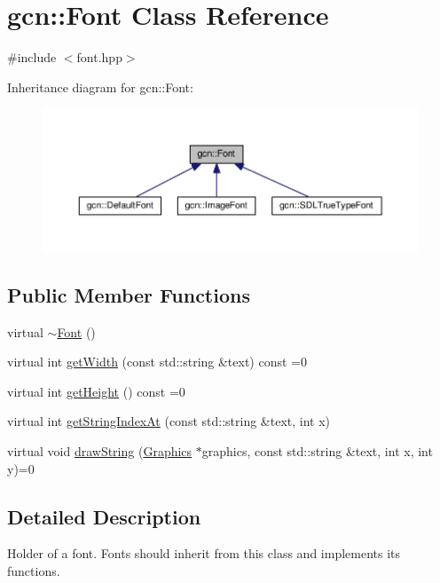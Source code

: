 \hypertarget{classgcn_1_1Font}{}\section{gcn\+:\+:Font Class Reference}
\label{classgcn_1_1Font}


{\ttfamily \#include $<$font.\+hpp$>$}



Inheritance diagram for gcn\+:\+:Font\+:\nopagebreak
\begin{figure}[H]
\begin{center}
\leavevmode
\includegraphics[width=350pt]{classgcn_1_1Font__inherit__graph}
\end{center}
\end{figure}
\subsection*{Public Member Functions}
\begin{DoxyCompactItemize}
\item 
virtual \hyperlink{classgcn_1_1Font_ab3bd1c57c092fe0ad1d027c4076e463d}{$\sim$\+Font} ()
\item 
virtual int \hyperlink{classgcn_1_1Font_abb88894b1ebeda28edcac75c537f8e0f}{get\+Width} (const std\+::string \&text) const =0
\item 
virtual int \hyperlink{classgcn_1_1Font_aa270d8934a16d4065143e3617b1fa926}{get\+Height} () const =0
\item 
virtual int \hyperlink{classgcn_1_1Font_a3210f4c53424ade4b188b8dfb1f686a4}{get\+String\+Index\+At} (const std\+::string \&text, int x)
\item 
virtual void \hyperlink{classgcn_1_1Font_a055c403050f483cc2c67477443d98eee}{draw\+String} (\hyperlink{classgcn_1_1Graphics}{Graphics} $\ast$graphics, const std\+::string \&text, int x, int y)=0
\end{DoxyCompactItemize}


\subsection{Detailed Description}
Holder of a font. Fonts should inherit from this class and implements it\textquotesingle{}s functions.

